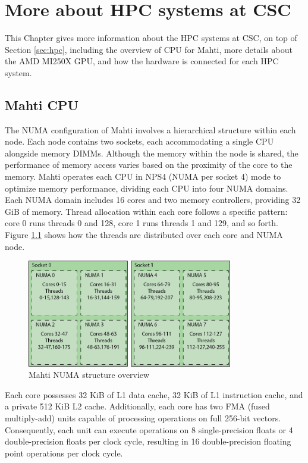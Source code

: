 \chapter{More about HPC systems at CSC}
This Chapter gives more information about the HPC systems at CSC, on top of Section \ref{sec:hpc}, including the overview of CPU for Mahti, more details about the AMD MI250X GPU, and how the hardware is connected for each HPC system.

\section{Mahti CPU}
The NUMA configuration of Mahti \cite{mahti} involves a hierarchical structure within each node. Each node contains two sockets, each accommodating a single CPU alongside memory DIMMs. Although the memory within the node is shared, the performance of memory access varies based on the proximity of the core to the memory. Mahti operates each CPU in NPS4 (NUMA per socket 4) mode to optimize memory performance, dividing each CPU into four NUMA domains. Each NUMA domain includes 16 cores and two memory controllers, providing 32 GiB of memory. Thread allocation within each core follows a specific pattern: core 0 runs threads 0 and 128, core 1 runs threads 1 and 129, and so forth. Figure \ref{fig_mahti_numa} shows how the threads are distributed over each core and NUMA node.

\begin{figure}[H]
    \centering
    \includegraphics[width=0.8\textwidth]{figures/mahti_numa.png}
    \caption{Mahti NUMA structure overview \cite{mahti}}
    \label{fig_mahti_numa}
\end{figure}

Each core possesses 32 KiB of L1 data cache, 32 KiB of L1 instruction cache, and a private 512 KiB L2 cache. Additionally, each core has two FMA (fused multiply-add) units capable of processing operations on full 256-bit vectors. Consequently, each unit can execute operations on 8 single-precision floats or 4 double-precision floats per clock cycle, resulting in 16 double-precision floating point operations per clock cycle.


